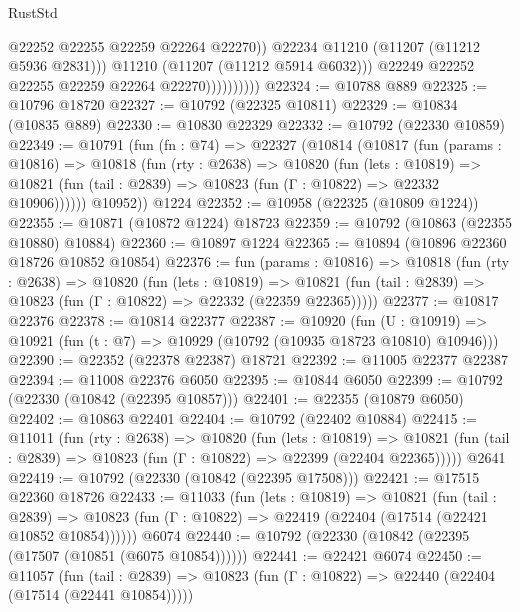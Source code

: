 \begin{lexlean}{RustStd}
\begin{coremodule}
                                @22252
                                @22255
                                @22259
                                @22264
                                @22270))
                            @22234
                            @11210
                            (@11207 (@11212 @5936 @2831)))
                          @11210
                          (@11207 (@11212 @5914 @6032)))
                        @22249
                        @22252
                        @22255
                        @22259
                        @22264
                        @22270))))))))))
@22324 := @10788 @889
@22325 := @10796 @18720
@22327 := @10792 (@22325 @10811)
@22329 := @10834 (@10835 @889)
@22330 := @10830 @22329
@22332 := @10792 (@22330 @10859)
@22349 := @10791
    (fun (fn : @74) =>
    @22327
      (@10814
        (@10817
          (fun (params : @10816) =>
          @10818
            (fun (rty : @2638) =>
            @10820
              (fun (lets : @10819) =>
              @10821 (fun (tail : @2839) => @10823 (fun (Γ : @10822) => @22332 @10906))))))
        @10952))
    @1224
@22352 := @10958 (@22325 (@10809 @1224))
@22355 := @10871 (@10872 @1224) @18723
@22359 := @10792 (@10863 (@22355 @10880) @10884)
@22360 := @10897 @1224
@22365 := @10894 (@10896 @22360 @18726 @10852 @10854)
@22376 := fun (params : @10816) =>
  @10818
    (fun (rty : @2638) =>
    @10820
      (fun (lets : @10819) =>
      @10821 (fun (tail : @2839) => @10823 (fun (Γ : @10822) => @22332 (@22359 @22365)))))
@22377 := @10817 @22376
@22378 := @10814 @22377
@22387 := @10920
    (fun (U : @10919) => @10921 (fun (t : @7) => @10929 (@10792 (@10935 @18723 @10810) @10946)))
@22390 := @22352 (@22378 @22387) @18721
@22392 := @11005 @22377 @22387
@22394 := @11008 @22376 @6050
@22395 := @10844 @6050
@22399 := @10792 (@22330 (@10842 (@22395 @10857)))
@22401 := @22355 (@10879 @6050)
@22402 := @10863 @22401
@22404 := @10792 (@22402 @10884)
@22415 := @11011
    (fun (rty : @2638) =>
    @10820
      (fun (lets : @10819) =>
      @10821 (fun (tail : @2839) => @10823 (fun (Γ : @10822) => @22399 (@22404 @22365)))))
    @2641
@22419 := @10792 (@22330 (@10842 (@22395 @17508)))
@22421 := @17515 @22360 @18726
@22433 := @11033
    (fun (lets : @10819) =>
    @10821
      (fun (tail : @2839) =>
      @10823 (fun (Γ : @10822) => @22419 (@22404 (@17514 (@22421 @10852 @10854))))))
    @6074
@22440 := @10792 (@22330 (@10842 (@22395 (@17507 (@10851 (@6075 @10854))))))
@22441 := @22421 @6074
@22450 := @11057
    (fun (tail : @2839) => @10823 (fun (Γ : @10822) => @22440 (@22404 (@17514 (@22441 @10854)))))

\end{coremodule}
\end{lexlean}
